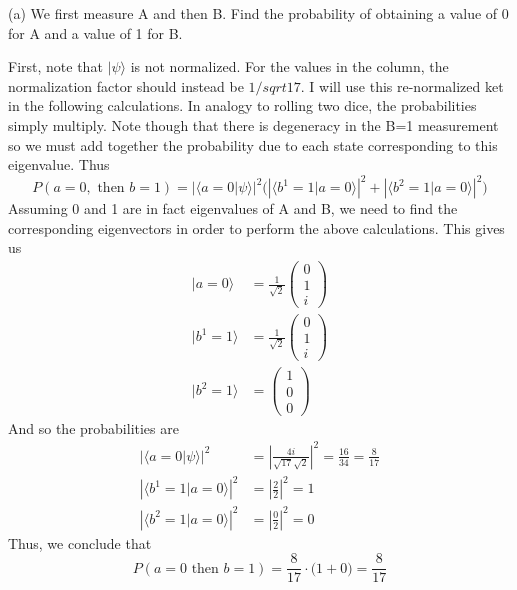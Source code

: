 \documentclass[a4paper, 11pt]{article}
\newcommand{\ket}[1]{|#1\rangle}
\newcommand{\braket}[2]{\langle #1 | #2 \rangle}
\newenvironment{solution}{%
	\begin{list}{}{%
			\setlength{\topsep}{0pt}%
			\setlength{\leftmargin}{1.5cm}%
			\setlength{\rightmargin}{1.5cm}%
			\setlength{\listparindent}{\parindent}%
			\setlength{\itemindent}{\parindent}%
			\setlength{\parsep}{\parskip}%
		}%
		\item[]}{\end{list}}
\begin{document}
\noindent (a) We first measure A and then B. Find the probability of obtaining a value of 0 for A and a value of 1 for B. \\
	\begin{solution}
		\noindent First, note that $\ket{\psi}$ is not normalized. For the values in the column, the normalization factor should instead be $1/sqrt{17}$. I will use this re-normalized ket in the following calculations. In analogy to rolling two dice, the probabilities simply multiply. Note though that there is degeneracy in the B=1 measurement so we must add together the probability due to each state corresponding to this eigenvalue. Thus 
			\begin{equation*}
				P(a=0, \text{ then } b=1) = \left|\braket{a=0}{\psi}\right|^2  \Bigg( \left|\braket{b^1=1}{a=0}\right|^2+\left|\braket{b^2=1}{a=0}\right|^2 \Bigg)
			\end{equation*}
		Assuming 0 and 1 are in fact eigenvalues of A and B, we need to find the corresponding eigenvectors in order to perform the above calculations. This gives us
			\begin{align*}
				\ket{a=0} &= \frac{1}{\sqrt{2}}\begin{pmatrix} 0 \\ 1 \\ i\end{pmatrix} \\ 
				\ket{b^1=1} &= \frac{1}{\sqrt{2}}\begin{pmatrix} 0 \\ 1 \\ i\end{pmatrix}\\
				\ket{b^2=1} &= \begin{pmatrix} 1 \\ 0 \\ 0\end{pmatrix}
			\end{align*}
		And so the probabilities are
			\begin{align*}
				\left|\braket{a=0}{\psi}\right|^2 &= \left|\frac{4i}{\sqrt{17}\sqrt{2}}\right|^2 = \frac{16}{34} = \frac{8}{17}\\
				\left| \braket{b^1=1}{a=0} \right|^2 &= \left|\frac{2}{2}\right|^2 = 1 \\ 
				\left| \braket{b^2=1}{a=0} \right|^2 &= \left|\frac{0}{2}\right|^2= 0
			\end{align*}
		Thus, we conclude that
			\begin{equation*}
				P\left( a=0 \text{ then } b=1 \right) = \frac{8}{17}\cdot \Big(1  + 0\Big) = \frac{8}{17}
			\end{equation*}
	\end{solution}
\end{document}
